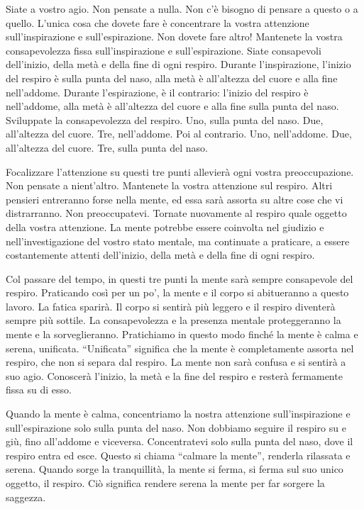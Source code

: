 Siate a vostro agio. Non pensate a nulla. Non c'è bisogno di pensare a
questo o a quello. L'unica cosa che dovete fare è concentrare la vostra
attenzione sull'inspirazione e sull'espirazione. Non dovete fare altro!
Mantenete la vostra consapevolezza fissa sull'inspirazione e
sull'espirazione. Siate consapevoli dell'inizio, della metà e della fine
di ogni respiro. Durante l'inspirazione, l'inizio del respiro è sulla
punta del naso, alla metà è all'altezza del cuore e alla fine
nell'addome. Durante l'espirazione, è il contrario: l'inizio del respiro
è nell'addome, alla metà è all'altezza del cuore e alla fine sulla punta
del naso. Sviluppate la consapevolezza del respiro. Uno, sulla punta del
naso. Due, all'altezza del cuore. Tre, nell'addome. Poi al contrario.
Uno, nell'addome. Due, all'altezza del cuore. Tre, sulla punta del naso.

Focalizzare l'attenzione su questi tre punti allevierà ogni vostra
preoccupazione. Non pensate a nient'altro. Mantenete la vostra
attenzione sul respiro. Altri pensieri entreranno forse nella mente, ed
essa sarà assorta su altre cose che vi distrarranno. Non preoccupatevi.
Tornate nuovamente al respiro quale oggetto della vostra attenzione. La
mente potrebbe essere coinvolta nel giudizio e nell'investigazione del
vostro stato mentale, ma continuate a praticare, a essere costantemente
attenti dell'inizio, della metà e della fine di ogni respiro.

Col passare del tempo, in questi tre punti la mente sarà sempre
consapevole del respiro. Praticando così per un po', la mente e il corpo
si abitueranno a questo lavoro. La fatica sparirà. Il corpo si sentirà
più leggero e il respiro diventerà sempre più sottile. La consapevolezza
e la presenza mentale proteggeranno la mente e la sorveglieranno.
Pratichiamo in questo modo finché la mente è calma e serena, unificata.
``Unificata'' significa che la mente è completamente assorta nel
respiro, che non si separa dal respiro. La mente non sarà confusa e si
sentirà a suo agio. Conoscerà l'inizio, la metà e la fine del respiro e
resterà fermamente fissa su di esso.

Quando la mente è calma, concentriamo la nostra attenzione
sull'inspirazione e sull'espirazione solo sulla punta del naso. Non
dobbiamo seguire il respiro su e giù, fino all'addome e viceversa.
Concentratevi solo sulla punta del naso, dove il respiro entra ed esce.
Questo si chiama ``calmare la mente'', renderla rilassata e serena.
Quando sorge la tranquillità, la mente si ferma, si ferma sul suo unico
oggetto, il respiro. Ciò significa rendere serena la mente per far
sorgere la saggezza.

